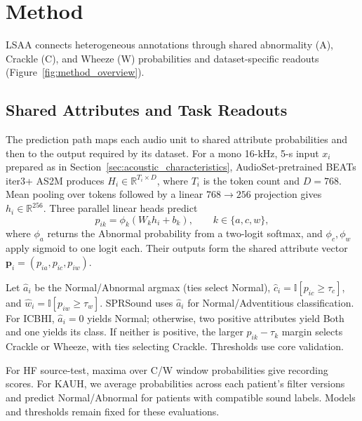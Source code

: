 \section{Method}
\label{sec:method}

LSAA connects heterogeneous annotations through shared abnormality (A),
Crackle (C), and Wheeze (W) probabilities and dataset-specific readouts
(Figure~\ref{fig:method_overview}).

\subsection{Shared Attributes and Task Readouts}
\label{sec:annotation_alignment}
\label{sec:native_readouts}
The prediction path maps each audio unit to shared attribute probabilities
and then to the output required by its dataset. For a mono 16-kHz, 5-s input $x_i$
prepared as in Section~\ref{sec:acoustic_characteristics},
AudioSet-pretrained BEATs iter3+ AS2M\cite{chen2023beats,gemmeke2017audioset}
produces $H_i\in\mathbb{R}^{T_i\times D}$, where $T_i$ is the token count
and $D=768$.
Mean pooling over tokens followed by a linear $768\to256$ projection
gives $h_i\in\mathbb{R}^{256}$. Three parallel linear heads predict
\begin{equation}
p_{ik}=\phi_k(W_k h_i+b_k),\qquad k\in\{a,c,w\},
\label{eq:attribute_predictions}
\end{equation}
where $\phi_a$ returns the Abnormal probability from a two-logit softmax,
and $\phi_c,\phi_w$ apply sigmoid to one logit each.
Their outputs form the shared attribute vector
$\mathbf p_i=(p_{ia},p_{ic},p_{iw})$.

Let $\hat a_i$ be the Normal/Abnormal argmax (ties select Normal),
$\hat c_i=\mathbb{I}[p_{ic}\geq\tau_c]$, and
$\hat w_i=\mathbb{I}[p_{iw}\geq\tau_w]$.
SPRSound uses $\hat a_i$ for Normal/Adventitious classification.
For ICBHI, $\hat a_i=0$ yields Normal; otherwise, two positive attributes
yield Both and one yields its class. If neither is positive, the larger
$p_{ik}-\tau_k$ margin selects Crackle or Wheeze, with ties selecting Crackle.
Thresholds use core validation.

For HF source-test, maxima over C/W window probabilities give recording
scores. For KAUH, we average probabilities across each patient's filter
versions and predict Normal/Abnormal for patients with compatible sound
labels. Models and thresholds remain fixed for these evaluations.

